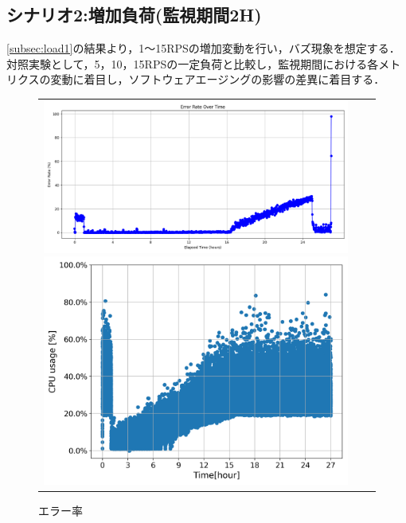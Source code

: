 \documentclass[twoside,twocolumn,10pt]{jarticle}  %
\begin{document}
\subsection{シナリオ2:増加負荷(監視期間2H)}
\ref{subsec:load1}の結果より，1～15RPSの増加変動を行い，バズ現象を想定する．
対照実験として，5，10，15RPSの一定負荷と比較し，監視期間における各メトリクスの変動に着目し，ソフトウェアエージングの影響の差異に着目する．
\begin{figure}[H]
  \begin{tabular}{rrr}
      \begin{minipage}{.164\textwidth}
          \centering
          \includegraphics[width=1.2\linewidth]{figures/8core_1_15rps_error_rate.png}
          \caption{エラー率}
          \label{f1}
      \end{minipage}
      \begin{minipage}{.164\textwidth}
          \centering
          \includegraphics[width=1.0\linewidth]{figures/8core_1_15rps_increase_cpu.png}

\end{minipage}
\end{tabular}
\end{figure}
\end{document}
